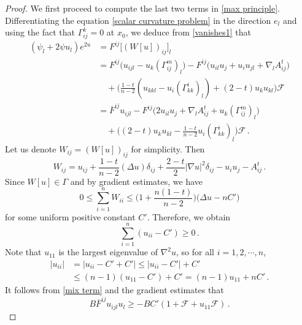 \documentclass[10pt,a4paper]{amsart}
\begin{document}
\begin{proof}
We first proceed to compute the last two terms in \eqref{max principle}. Differentiating the equation \eqref{scalar curvature problem} in the direction $e_l$ and using the fact that $\Gamma_{ij}^{k}=0$ at $x_0$, we deduce from \eqref{vanishes1} that
\begin{equation}\label{mix term}
\begin{split}
(\psi_{l}+2\psi u_{l})e^{2u}&=F^{ij}\big[(W[u])_{ij}\big]_{l}\\
&=F^{ij}\big(u_{ijl}-u_{k}(\Gamma_{ij}^{m})_{l} \big)-F^{ij}\big(u_{il}u_{j}+u_{i}u_{jl}+\nabla_{l}A^{t}_{ij}\big)\\
& \quad +\Big(\frac{1-t}{n-2}(u_{kkl}-u_{i}(\Gamma_{kk}^{i})_{l})+(2-t)u_{k} u_{kl}\Big)\mathcal{F}\\
&=\overline{F}^{ij}u_{ijl}-F^{ij}\big(2u_{il}u_{j}+\nabla_{l}A^{t}_{ij}+u_{k}(\Gamma_{ij}^{m})_{l}\big)\\
&\quad +\big((2-t)u_{k} u_{kl}-\frac{1-t}{n-2}u_{i}(\Gamma_{kk}^{i})_{l}\big)\mathcal{F}\,.
\end{split}
\end{equation}
Let us denote $W_{ij}=(W[u])_{ij}$ for simplicity. Then
\[
W_{ij}=u_{ij}+\frac{1-t}{n-2}(\Delta u)\delta_{ij}+\frac{2-t}{2}|\nabla u|^2\delta_{ij}-u_{i}u_{j}-A^{t}_{ij}\,.
\]
Since $W[u] \in \Gamma$ and by gradient estimates, we have
\[
0\leq \sum_{i=1}^{n}W_{ii}\leq \big(1+\frac{n(1-t)}{n-2}\big)\big(\Delta u-nC'\big)
\]
for some uniform positive constant $C'$. Therefore, we obtain
\[
\sum_{i=1}^{n}(u_{ii}-C')\geq 0\,.
\]
Note that $u_{11}$ is the largest eigenvalue of $\nabla^2u$, so for all $i=1,2,\cdots,n$,
\[
\begin{split}
|u_{ii}|&=|u_{ii}-C'+C'|\leq |u_{ii}-C'|+C'\\
&\leq  (n-1)(u_{11}-C')+C'=(n-1)u_{11}+nC'\,.
\end{split}
\]
It follows from \eqref{mix term} and the gradient estimates that
\begin{equation}
B\overline{F}^{ij}u_{ijl}u_{l}\geq -BC' (1+\mathcal{F}+u_{11}\mathcal{F} )\,.
\end{equation}


\end{proof}
\end{document}
